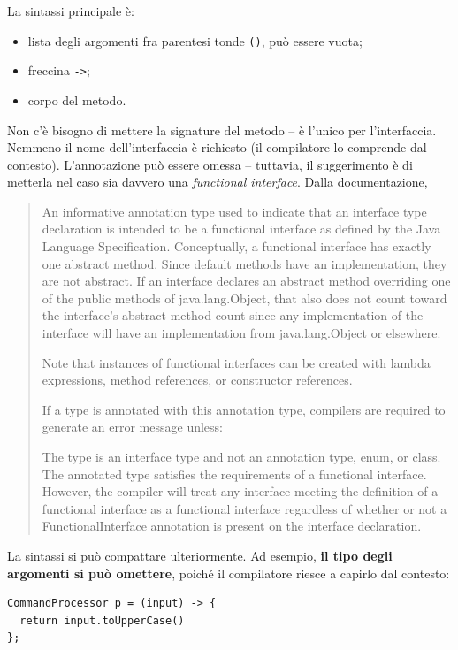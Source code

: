 \documentclass[\fontsizeclass,twocolumn]{\classname}
\theoremstyle{definition}
\theoremstyle{definition}
\begin{document}
La sintassi principale è:
\begin{itemize}
    \item lista degli argomenti fra parentesi tonde \texttt{()}, può essere
        vuota;
    \item freccina \texttt{->};
    \item corpo del metodo.
\end{itemize}

Non c'è bisogno di mettere la signature del metodo -- è l'unico per
l'interfaccia. Nemmeno il nome dell'interfaccia è richiesto (il compilatore lo
comprende dal contesto). L'annotazione può essere omessa -- tuttavia, il
suggerimento è di metterla nel caso sia davvero una \emph{functional
interface}. Dalla documentazione,

\begin{quote}
    \footnotesize{An informative annotation type used to indicate that an
        interface type declaration is intended to be a functional interface as
        defined by the Java Language Specification. Conceptually, a functional
        interface has exactly one abstract method. Since default methods have
        an implementation, they are not abstract. If an interface declares an
        abstract method overriding one of the public methods of
        java.lang.Object, that also does not count toward the interface's
        abstract method count since any implementation of the interface will
        have an implementation from java.lang.Object or elsewhere.

Note that instances of functional interfaces can be created with lambda
expressions, method references, or constructor references.

If a type is annotated with this annotation type, compilers are required to
generate an error message unless:

The type is an interface type and not an annotation type, enum, or class. The
annotated type satisfies the requirements of a functional interface. However,
the compiler will treat any interface meeting the definition of a functional
interface as a functional interface regardless of whether or not a
FunctionalInterface annotation is present on the interface declaration.}
\end{quote}

La sintassi si può compattare ulteriormente. Ad esempio, \textbf{il tipo degli
argomenti si può omettere}, poiché il compilatore riesce a capirlo dal
contesto:

\begin{lstlisting}
CommandProcessor p = (input) -> {
  return input.toUpperCase()
};
\end{lstlisting}
\end{document}
